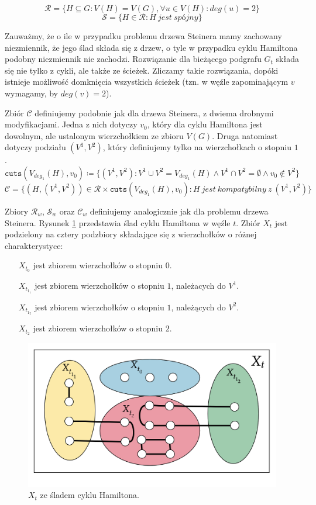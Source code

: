 \documentclass[12pt, oneside]{report}
\begin{document}
$$\mathcal{R} = \{H \subseteq G: V(H) = V(G), \forall u \in V(H): deg(u) = 2\}$$
$$\mathcal{S} = \{H \in \mathcal{R}: H\ jest\ sp\mbox{ó}jny\}$$

Zauważmy, że o ile w przypadku problemu drzewa Steinera mamy zachowany niezmiennik, że jego ślad składa się z drzew, o tyle w przypadku cyklu Hamiltona podobny niezmiennik nie zachodzi. Rozwiązanie dla bieżącego podgrafu $G_t$ składa się nie tylko z cykli, ale także ze ścieżek. Zliczamy takie rozwiązania, dopóki istnieje możliwość domknięcia wszystkich ścieżek (tzn. w węźle zapominającym $v$ wymagamy, by $deg(v) = 2$).

Zbiór $\mathcal{C}$ definiujemy podobnie jak dla drzewa Steinera, z dwiema drobnymi modyfikacjami. Jedna z nich dotyczy $v_0$, który dla cyklu Hamiltona jest dowolnym, ale ustalonym wierzchołkiem ze zbioru $V(G)$. Druga natomiast dotyczy podziału $(V^1, V^2)$, który definiujemy tylko na wierzchołkach o stopniu $1$.
$$\texttt{cuts} (V_{deg_1}(H), v_0) \coloneqq \{(V^1, V^2): V^1 \cup V^2 = V_{deg_1}(H) \wedge V^1 \cap V^2 = \emptyset \wedge v_0 \notin V^2\}$$
$$\mathcal{C} = \{(H, (V^1, V^2)) \in \mathcal{R} \times \texttt{cuts}(V_{deg_1}(H), v_0) : H\ jest\ kompatybilny\ z\ (V^1, V^2)\}$$

Zbiory $\mathcal{R}_w$, $\mathcal{S}_w$ oraz $\mathcal{C}_w$ definiujemy analogicznie jak dla problemu drzewa Steinera. Rysunek \ref{cnc_hamiltonian} przedstawia ślad cyklu Hamiltona w węźle $t$. Zbiór $X_t$ jest podzielony na cztery podzbiory składające się z wierzchołków o różnej charakterystyce:
\addtolength{\leftmargini}{3cm}
\begin{itemize}[noitemsep,topsep=5pt,parsep=0pt,partopsep=0pt]
\item[$X_{t_0}$ ] jest zbiorem wierzchołków o stopniu $0$.
\item[$X_{t_{1_1}}$] jest zbiorem wierzchołków o stopniu $1$, należacych do $V^1$.
\item[$X_{t_{1_2}}$] jest zbiorem wierzchołków o stopniu $1$, należących do $V^2$.
\item[$X_{t_2}$ ] jest zbiorem wierzchołków o stopniu $2$.
\end{itemize}
\addtolength{\leftmargini}{-3cm}
\begin{figure}
\centering
\label{cnc_hamiltonian}
\includegraphics[width=16cm]{cnc_hamiltonian.png}
\caption{$X_t$ ze śladem cyklu Hamiltona.}
\end{figure}
$$$$
\end{document}
